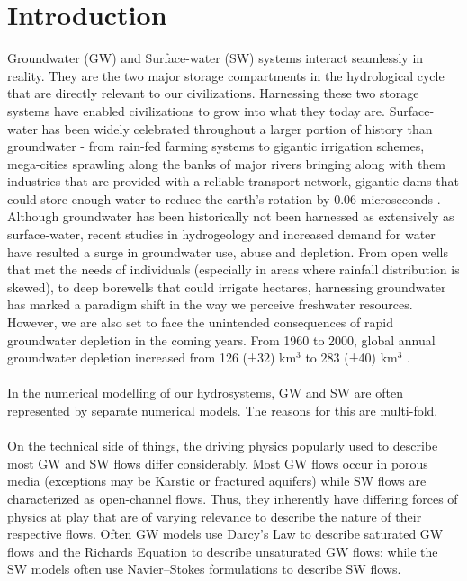\chapter{Introduction} \label{intro}

Groundwater (GW) and Surface-water (SW) systems interact seamlessly in reality. They are the two major storage compartments in the hydrological cycle that are directly relevant to our civilizations.
Harnessing these two storage systems have enabled civilizations to grow into what they today are. Surface-water has been widely celebrated throughout a larger portion of history than groundwater - from rain-fed farming systems to gigantic irrigation schemes, mega-cities sprawling along the banks of major rivers bringing along with them industries that are provided with a reliable transport network, gigantic dams that could store enough water to reduce the earth's rotation by 0.06 microseconds \cite{nasa/jpl_2005}. Although groundwater has been historically not been harnessed as extensively as surface-water, recent studies in hydrogeology and increased demand for water have resulted a surge in groundwater use, abuse and depletion. From open wells that met the needs of individuals (especially in areas where rainfall distribution is skewed), to deep borewells that could irrigate hectares, harnessing groundwater has marked a paradigm shift in the way we perceive freshwater resources. However, we are also set to face the unintended consequences of rapid groundwater depletion in the coming years. From 1960 to 2000, global annual groundwater depletion increased from 126 (±32) km$^3$ to 283 (±40) km$^3$ \cite{Wada2010}.
\\ \\
In the numerical modelling of our hydrosystems, GW and SW are often represented by separate numerical models. The reasons for this are multi-fold.
\\ \\
On the technical side of things, the driving physics popularly used to describe most GW and SW flows differ considerably. Most GW flows occur in porous media (exceptions may be Karstic or fractured aquifers) while SW flows are characterized as open-channel flows. Thus, they inherently have differing forces of physics at play that are of varying relevance to describe the nature of their respective flows. Often GW models use Darcy's Law to describe saturated GW flows and the Richards Equation to describe unsaturated GW flows; while the SW models often use Navier–Stokes formulations to describe SW flows.
\\
